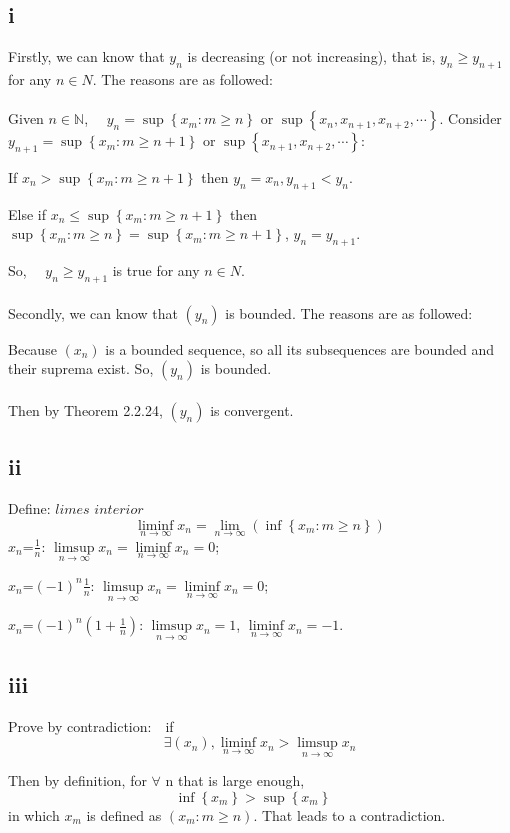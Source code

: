 \documentclass[11pt,twoside,a4paper]{article}
\begin{document}
\subsection{i}
Firstly, we can know that $y_{n}$ is decreasing (or not increasing), that
is,  $y_{n} \geq y_{n+1} $ for any
 $n \in N $. The reasons are as followed:
\\ \hspace*{\fill} \\
Given  $n \in \mathbb{N}$, $\quad y_{n}=\sup \left\{x_{m}: m \geq n\right\} $ or $ \sup \left\{x_{n}, x_{n+1}, x_{n+2}, \cdots\right\} $.
Consider  $y_{n+1}=\sup \left\{x_{m}: m \geq n+1\right\} $ or  $\sup \left\{x_{n+1}, x_{n+2}, \cdots\right\} $:
\par
If $x_{n}>\sup \left\{x_{m}: m \geq n+1\right\}$ then $y_{n}=x_{n},y_{n+1}<y_{n}$.
\par
Else if  $x_{n} \leq \sup \left\{x_{m}: m \geq n+1\right\}$  then $ \sup  \left\{x_{m}: m \geq n\right\}=\sup \left\{x_{m}: m \geq n+1\right\}$, $ y_{n}=y_{n+1}$. 
\par\noindent
So, $\quad y_{n} \geqslant y_{n+1}$  is true for any
$n \in N$.
\\ \hspace*{\fill} \\
Secondly, we can know that  $\left(y_{n}\right)$  is bounded. The reasons are as followed:
\par\noindent
Because  $\left(x_{n}\right)$  is a bounded sequence, so all its subsequences are bounded and their suprema exist. So, $(y_{n})$ is bounded.
\\ \hspace*{\fill} \\
Then by Theorem 2.2.24,  $\left(y_{n}\right)$  is convergent.
\subsection{ii}
Define: $limes$ $interior$
$$\liminf\limits_{n\to\infty}x_{n}=\lim\limits_{n\to \infty}(\inf \left\{x_{m}: m \geq n\right\})$$
$x_{n}$=$\frac{1}{n}$: $\limsup\limits_{n\to\infty}x_{n}=\liminf\limits_{n\to\infty}x_{n}=0$;
\par\noindent
$x_{n}$=$(-1)^{n}\frac{1}{n}$: $\limsup\limits_{n\to\infty}x_{n}=\liminf\limits_{n\to\infty}x_{n}=0$;
\par\noindent
$x_{n}$=$(-1)^{n}(1+\frac{1}{n})$: $\limsup\limits_{n\to\infty}x_{n}=1$, $\liminf\limits_{n\to\infty}x_{n}=-1$.
\subsection{iii}
Prove by contradiction:$\quad$if  $$\exists\left(x_{n}\right), \liminf\limits_{n \to \infty} x_{n}>\limsup\limits_{n \rightarrow \infty} x_{n} $$
\par\noindent
Then by definition, for $\forall$ n  that is large enough,
$$ \inf \left\{x_{m}\right\}>\sup \left\{x_{m}\right\} \quad$$  in which  $x_{m}$  is defined as  $\left(x_{m}: m \geq n\right) $. 
That leads to a contradiction.
\end{document}
